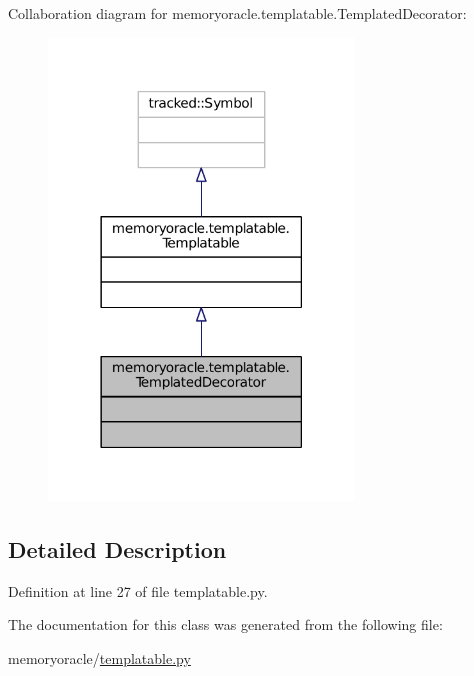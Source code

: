 Collaboration diagram for memoryoracle.\+templatable.\+Templated\+Decorator\+:\nopagebreak
\begin{figure}[H]
\begin{center}
\leavevmode
\includegraphics[width=230pt]{classmemoryoracle_1_1templatable_1_1TemplatedDecorator__coll__graph}
\end{center}
\end{figure}


\subsection{Detailed Description}


Definition at line 27 of file templatable.\+py.



The documentation for this class was generated from the following file\+:\begin{DoxyCompactItemize}
\item 
memoryoracle/\hyperlink{templatable_8py}{templatable.\+py}\end{DoxyCompactItemize}
